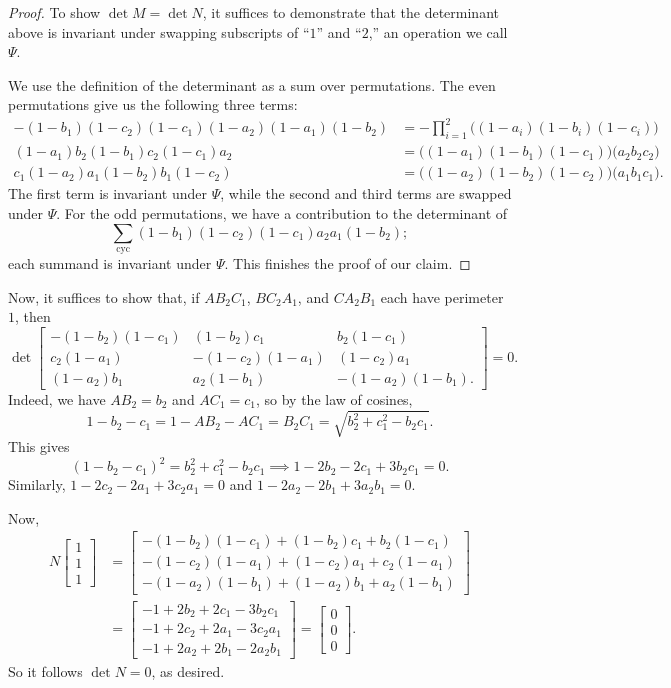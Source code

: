 \documentclass[11pt]{scrartcl}
\begin{document}
\begin{proof}
  To show $\det M=\det N$,
  it suffices to demonstrate that the determinant above is invariant
  under swapping subscripts of ``$1$'' and ``$2$,'' an operation we call $\Psi$.

  We use the definition of the determinant as a sum over permutations.
  The even permutations give us the following three terms:
  \begin{align*}
    -(1-b_1)(1-c_2)(1-c_1)(1-a_2)(1-a_1)(1-b_2)
      &= -\prod_{i=1}^2\big((1-a_i)(1-b_i)(1-c_i)\big)\\
    (1-a_1)b_2(1-b_1)c_2(1-c_1)a_2
      &= \big((1-a_1)(1-b_1)(1-c_1)\big)\big(a_2b_2c_2\big)\\
    c_1(1-a_2)a_1(1-b_2)b_1(1-c_2)
      &= \big((1-a_2)(1-b_2)(1-c_2)\big)\big(a_1b_1c_1\big).
  \end{align*}
  The first term is invariant under $\Psi$,
  while the second and third terms are swapped under $\Psi$.
  For the odd permutations, we have a contribution to the determinant of
  \[ \sum_{\text{cyc}}(1-b_1)(1-c_2)(1-c_1)a_2a_1(1-b_2); \]
  each summand is invariant under $\Psi$.
  This finishes the proof of our claim.
\end{proof}

Now, it suffices to show that, if $AB_2C_1$, $BC_2A_1$, and $CA_2B_1$
each have perimeter $1$, then
\[
  \det \begin{bmatrix}
    -(1-b_2)(1-c_1) & (1-b_2)c_1 & b_2(1-c_1)\\
    c_2(1-a_1) & -(1-c_2)(1-a_1) & (1-c_2)a_1\\
    (1-a_2)b_1 & a_2(1-b_1) & -(1-a_2)(1-b_1).
  \end{bmatrix} = 0. \]
Indeed, we have $AB_2=b_2$ and $AC_1=c_1$, so by the law of cosines,
\[ 1-b_2-c_1=1-AB_2-AC_1=B_2C_1=\sqrt{b_2^2+c_1^2-b_2c_1}. \]
This gives
\[ (1-b_2-c_1)^2=b_2^2+c_1^2-b_2c_1\implies 1-2b_2-2c_1+3b_2c_1=0. \]
Similarly, $1-2c_2-2a_1+3c_2a_1=0$ and $1-2a_2-2b_1+3a_2b_1=0$.

Now,
\begin{align*}
  N\begin{bmatrix} 1 \\ 1 \\ 1 \end{bmatrix}
  &= \begin{bmatrix}
    -(1-b_2)(1-c_1)+(1-b_2)c_1+b_2(1-c_1) \\
   -(1-c_2)(1-a_1)+(1-c_2)a_1+c_2(1-a_1) \\
   -(1-a_2)(1-b_1)+(1-a_2)b_1+a_2(1-b_1)
 \end{bmatrix}\\
  &= \begin{bmatrix}
   -1+2b_2+2c_1-3b_2c_1\\
   -1+2c_2+2a_1-3c_2a_1\\
   -1+2a_2+2b_1-2a_2b_1
  \end{bmatrix}
  =\begin{bmatrix} 0 \\ 0 \\ 0 \end{bmatrix}.
\end{align*}
So it follows $\det N = 0$, as desired.
\pagebreak
\end{document}
